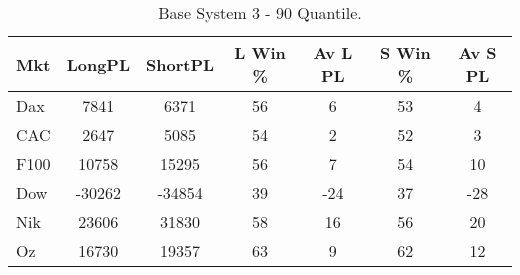 \begin{table}[ht]
\centering
\caption[Base System 3]{Base System 3 - 90 Quantile.} 
\label{tab:q_90_results}
\begin{tabular}{lcccccc}
  \toprule Mkt & LongPL & ShortPL & L Win \% & Av L PL & S Win \% & Av S PL \\ 
  \midrule Dax & 7841 & 6371 & 56 & 6 & 53 & 4 \\ 
  CAC & 2647 & 5085 & 54 & 2 & 52 & 3 \\ 
  F100 & 10758 & 15295 & 56 & 7 & 54 & 10 \\ 
  Dow & -30262 & -34854 & 39 & -24 & 37 & -28 \\ 
  Nik & 23606 & 31830 & 58 & 16 & 56 & 20 \\ 
  Oz & 16730 & 19357 & 63 & 9 & 62 & 12 \\ 
   \bottomrule \end{tabular}
\end{table}
